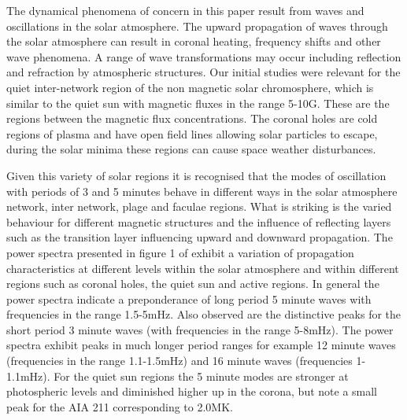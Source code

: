 \documentclass[twocolumn]{aastex62}
\begin{document}
 
The dynamical phenomena of concern in this paper result from waves and oscillations in the solar atmosphere. The upward propagation of waves through the solar atmosphere can result in coronal heating, frequency shifts and other wave phenomena. A range of wave transformations may occur including reflection and refraction by atmospheric structures. Our initial studies were relevant for the quiet inter-network region of the non magnetic solar chromosphere, which is similar to the quiet sun with magnetic fluxes in the range 5-10G. These are the regions between the magnetic flux concentrations. The coronal holes are cold regions of plasma  and  have open field lines allowing solar particles to escape, during the solar minima these regions can cause space weather disturbances. 

Given this variety of solar regions it is recognised that the modes of oscillation with periods of 3 and 5 minutes behave in different ways in the solar atmosphere network, inter network, plage and faculae regions. What is striking is the varied behaviour for different magnetic structures and the influence of reflecting layers such as the transition layer influencing upward and downward propagation.  The power spectra presented in figure 1 of \citet{Griffiths2018} exhibit a variation of propagation characteristics at different levels within the solar atmosphere and within different regions such as coronal holes, the quiet sun and active regions. In general the power spectra indicate a preponderance of long period 5 minute waves with frequencies in the range 1.5-5mHz. Also observed are the distinctive peaks for the short period 3 minute waves (with frequencies in the range 5-8mHz). The power spectra exhibit peaks in much longer period ranges for example 12 minute waves  (frequencies in the range 1.1-1.5mHz)  and 16 minute waves (frequencies 1-1.1mHz). For the quiet sun regions the 5 minute modes are stronger at photospheric levels and diminished higher up in the corona, but note a small peak for the AIA 211 corresponding to 2.0MK. 

\end{document}

